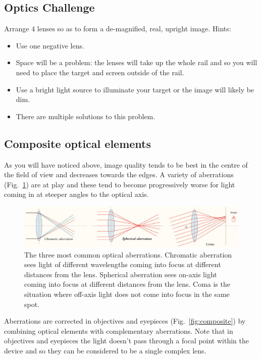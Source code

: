 \documentclass[a4paper]{report}
\begin{document}
\clearpage


\subsection{Optics Challenge}
Arrange 4 lenses so as to form a de-magnified, real, upright image. Hints: 
\begin{itemize}
\item Use one negative lens.
\item Space will be a problem: the lenses will take up the whole rail and so you will need to place the target and screen outside of the rail.
\item Use a bright light source to illuminate your target or the image will likely be dim. 
\item There are multiple solutions to this problem.
\end{itemize}



\subsection{Composite optical elements}
As you will have noticed above, image quality tends to be best in the centre of the field of view and decreases towards the edges. 
A variety of aberrations (Fig.~\ref{fig:aberrations}) are at play and these tend to become progressively worse for light coming in at steeper angles to the optical axis.

\begin{figure}[h]
\center
\includegraphics[width=6in]{aberrations.eps}
\caption{The three most common optical aberrations. 
Chromatic aberration sees light of different wavelengths coming into focus at different distances from the lens.
Spherical aberration sees on-axis light coming into focus at different distances from the lens. 
Coma is the situation where off-axis light does not come into focus in the same spot. }
\label{fig:aberrations}
\end{figure}

Aberrations are corrected in objectives and eyepieces (Fig.~\ref{fig:composite}) by combining optical elements with complementary aberrations. 
Note that in objectives and eyepieces the light doesn't pass through a focal point within the device and so they can be considered to be a single complex lens.
\end{document}
